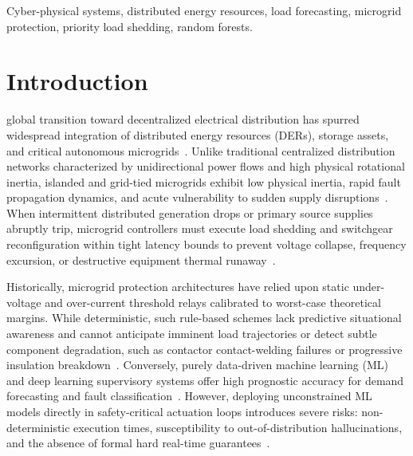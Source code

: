 \documentclass[journal,10pt,twocolumn]{IEEEtran}
\begin{document}
\begin{IEEEkeywords}
Cyber-physical systems, distributed energy resources, load forecasting, microgrid protection, priority load shedding, random forests.
\end{IEEEkeywords}

\section{Introduction}
 global transition toward decentralized electrical distribution has spurred widespread integration of distributed energy resources (DERs), storage assets, and critical autonomous microgrids~\cite{farhangi2010path, hatziargyriou2007microgrids}. Unlike traditional centralized distribution networks characterized by unidirectional power flows and high physical rotational inertia, islanded and grid-tied microgrids exhibit low physical inertia, rapid fault propagation dynamics, and acute vulnerability to sudden supply disruptions~\cite{kundur2004definition}. When intermittent distributed generation drops or primary source supplies abruptly trip, microgrid controllers must execute load shedding and switchgear reconfiguration within tight latency bounds to prevent voltage collapse, frequency excursion, or destructive equipment thermal runaway~\cite{bollen2000understanding}.

Historically, microgrid protection architectures have relied upon static under-voltage and over-current threshold relays calibrated to worst-case theoretical margins. While deterministic, such rule-based schemes lack predictive situational awareness and cannot anticipate imminent load trajectories or detect subtle component degradation, such as contactor contact-welding failures or progressive insulation breakdown~\cite{aravanis2018time}. Conversely, purely data-driven machine learning (ML) and deep learning supervisory systems offer high prognostic accuracy for demand forecasting and fault classification~\cite{mocanu2016deep, chen2016xgboost}. However, deploying unconstrained ML models directly in safety-critical actuation loops introduces severe risks: non-deterministic execution times, susceptibility to out-of-distribution hallucinations, and the absence of formal hard real-time guarantees~\cite{ten2008vulnerability}.
\end{document}
